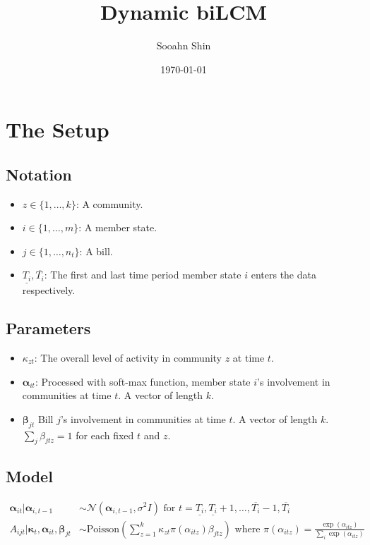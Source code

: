 \documentclass{article}
\title{Dynamic biLCM}
\author{Sooahn Shin}
\date{\today}
\begin{document}
\maketitle

\section{The Setup}

\subsection*{Notation}

\begin{itemize}
	\item $z \in \{1, \ldots, k\}$: A community.
	\item $i \in \{1, \ldots, m\}$: A member state.
	\item $j \in \{1, \ldots, n_{t}\}$: A bill.
	\item $\underline{T_i}, \overline{T_i}$: The first and last time period member state $i$ enters the data respectively.
\end{itemize}

\subsection*{Parameters}

\begin{itemize}
	\item $\kappa_{zt}$: The overall level of activity in community $z$ at time $t$.
	\item $\bm\alpha_{it}$: Processed with soft-max function, member state $i$'s involvement in communities at time $t$. A vector of length $k$.
	\item $\bm\beta_{jt}$ Bill $j$'s involvement in communities at time $t$. A vector of length $k$. $\sum_j \beta_{jtz} = 1$ for each fixed $t$ and $z$.
\end{itemize}

\subsection*{Model}

\begin{align}
	\bm\alpha_{it} | \bm\alpha_{i,t-1} &\sim \mathcal{N}(\bm\alpha_{i,t-1}, \sigma^2I) \text{ for } t = \underline{T_i}, \underline{T_i}+1, \ldots, \overline{T_i}-1, \overline{T_i} \\
	A_{ijt} | \bm\kappa_t, \bm\alpha_{it}, \bm\beta_{jt} &\sim \text{Poisson}(\sum_{z=1}^k \kappa_{zt}\pi(\alpha_{itz})\beta_{jtz}) \text{ where } \pi(\alpha_{itz}) = \frac{\exp(\alpha_{itz})}{\sum_i \exp(\alpha_{itz})} 
\end{align}
\end{document}
